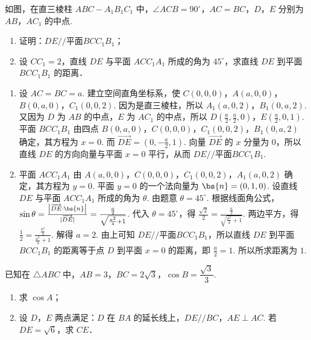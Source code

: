 \documentclass[UTF8,a4paper,oneside,11pt]{ctexbook}
\begin{document}
\begin{problem}
如图，在直三棱柱 \(ABC-A_1B_1C_1\) 中，\(\angle ACB=90^\circ\)，\(AC=BC\)，\(D\)，\(E\) 分别为 \(AB\)，\(AC_1\) 的中点.

\begin{enumerate}
\item 证明：\(DE // \text{平面} BCC_1B_1\)；
\item 设 \(CC_1=2\)，直线 \(DE\) 与平面 \(ACC_1A_1\) 所成的角为 \(45^\circ\)，求直线 \(DE\) 到平面 \(BCC_1B_1\) 的距离．
\end{enumerate}

\end{problem}

\begin{solution}
\begin{enumerate}
\item 设 \(AC=BC=a\). 建立空间直角坐标系，使 \(C(0,0,0)\)，\(A(a,0,0)\)，\(B(0,a,0)\)，\(C_1(0,0,2)\). 因为是直三棱柱，所以 \(A_1(a,0,2)\)，\(B_1(0,a,2)\). 又因为 \(D\) 为 \(AB\) 的中点，\(E\) 为 \(AC_1\) 的中点，所以 \(D\left( \frac{a}{2},\frac{a}{2},0 \right)\)，\(E\left( \frac{a}{2},0,1 \right)\).
平面 \(BCC_1B_1\) 由四点 \(B(0,a,0)\)，\(C(0,0,0)\)，\(C_1(0,0,2)\)，\(B_1(0,a,2)\) 确定，其方程为 \(x=0\). 而 \(\overrightarrow{DE}=\left( 0,-\frac{a}{2},1 \right)\). 向量 \(\overrightarrow{DE}\) 的 \(x\) 分量为 \(0\)，所以直线 \(DE\) 的方向向量与平面 \(x=0\) 平行，从而 \(DE // \text{平面} BCC_1B_1\).

\item 平面 \(ACC_1A_1\) 由 \(A(a,0,0)\)，\(C(0,0,0)\)，\(C_1(0,0,2)\)，\(A_1(a,0,2)\) 确定，其方程为 \(y=0\). 平面 \(y=0\) 的一个法向量为 \(\bs{n}=(0,1,0)\).
设直线 \(DE\) 与平面 \(ACC_1A_1\) 所成的角为 \(\theta\). 由题意 \(\theta=45^\circ\). 根据线面角公式，\(\sin\theta=\frac{\left| \overrightarrow{DE}\cdot \bs{n} \right|}{\lvert \overrightarrow{DE}\rvert}=\frac{\frac{a}{2}}{\sqrt{\frac{a^2}{4}+1}}\).
代入 \(\theta=45^\circ\)，得 \(\frac{\sqrt{2}}{2}=\frac{\frac{a}{2}}{\sqrt{\frac{a^2}{4}+1}}\). 两边平方，得 \(\frac{1}{2}=\frac{\frac{a^2}{4}}{\frac{a^2}{4}+1}\). 解得 \(a=2\).
由上可知 \(DE // \text{平面} BCC_1B_1\)，所以直线 \(DE\) 到平面 \(BCC_1B_1\) 的距离等于点 \(D\) 到平面 \(x=0\) 的距离，即 \(\frac{a}{2}=1\). 所以所求距离为 \(1\).
\end{enumerate}
\end{solution}

\begin{problem}
已知在 \(\triangle ABC\) 中，\(AB=3\)，\(BC=2\sqrt{3}\)，\(\cos B=\dfrac{\sqrt{3}}{3}\).

\begin{enumerate}
\item 求 \(\cos A\)；
\item 设 \(D\)，\(E\) 两点满足：\(D\) 在 \(BA\) 的延长线上，\(DE // BC\)，\(AE\perp AC\). 若 \(DE=\sqrt{6}\)，求 \(CE\)．
\end{enumerate}
\end{problem}
\end{document}
